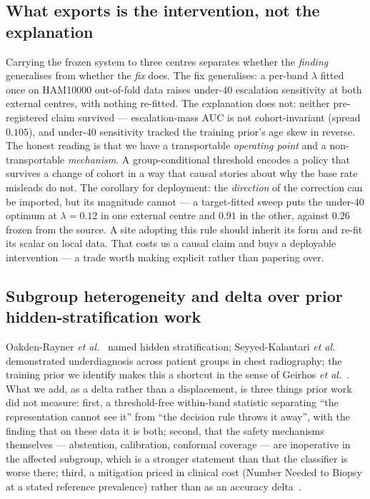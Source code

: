 \documentclass[journal]{IEEEtran}
\begin{document}
\subsection{What exports is the intervention, not the explanation}
Carrying the frozen system to three centres separates whether the \emph{finding} generalises
from whether the \emph{fix} does. The fix generalises: a per-band $\lambda$ fitted once on
HAM10000 out-of-fold data raises under-$40$ escalation sensitivity at both external centres,
with nothing re-fitted. The explanation does not: neither pre-registered claim survived ---
escalation-mass AUC is not cohort-invariant (spread $0.105$), and under-$40$ sensitivity
tracked the training prior's age skew in reverse. The honest reading is that we have a
transportable \emph{operating point} and a non-transportable \emph{mechanism}. A
group-conditional threshold encodes a policy that survives a change of cohort in a way that
causal stories about why the base rate misleads do not. The corollary for deployment: the
\emph{direction} of the correction can be imported, but its magnitude cannot --- a
target-fitted sweep puts the under-$40$ optimum at $\lambda=0.12$ in one external centre and
$0.91$ in the other, against $0.26$ frozen from the source. A site adopting this rule should
inherit its form and re-fit its scalar on local data. That costs us a causal claim and buys a
deployable intervention --- a trade worth making explicit rather than papering over.

\subsection{Subgroup heterogeneity and delta over prior hidden-stratification work}
Oakden-Rayner \emph{et al.}~\cite{oakdenrayner2020hidden} named hidden stratification;
Seyyed-Kalantari \emph{et al.}~\cite{seyyedkalantari2021underdiagnosis} demonstrated
underdiagnosis across patient groups in chest radiography; the training prior we identify
makes this a shortcut in the sense of Geirhos \emph{et
al.}~\cite{geirhos2020shortcut}. What we add, as a delta rather than a displacement, is three
things prior work did not measure: first, a threshold-free within-band statistic separating
``the representation cannot see it'' from ``the decision rule throws it away'', with the
finding that on these data it is both; second, that the safety mechanisms themselves ---
abstention, calibration, conformal coverage --- are inoperative in the affected subgroup,
which is a stronger statement than that the classifier is worse there; third, a mitigation
priced in clinical cost (Number Needed to Biopsy at a stated reference prevalence) rather than
as an accuracy delta~\cite{hardt2016equality}.
\end{document}
